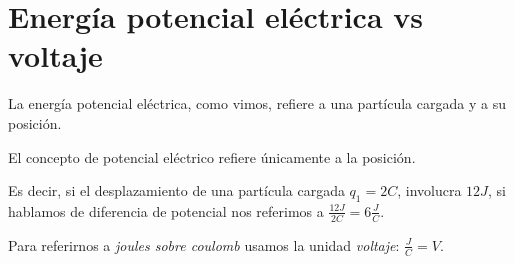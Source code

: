 \section{Energía potencial eléctrica vs voltaje}

La energía potencial eléctrica,
como vimos,
refiere a una partícula cargada y a su posición.

El concepto de potencial eléctrico refiere únicamente a la posición.

Es decir,
si el desplazamiento de una partícula cargada \(q_1 = 2C\),
involucra \(12J\),
si hablamos de diferencia de potencial nos referimos a \(\frac{12J}{2C} = 6 \frac{J}{C}\).

Para referirnos a \textit{joules sobre coulomb}
usamos la unidad \textit{voltaje}: \(\frac{J}{C} = V\).